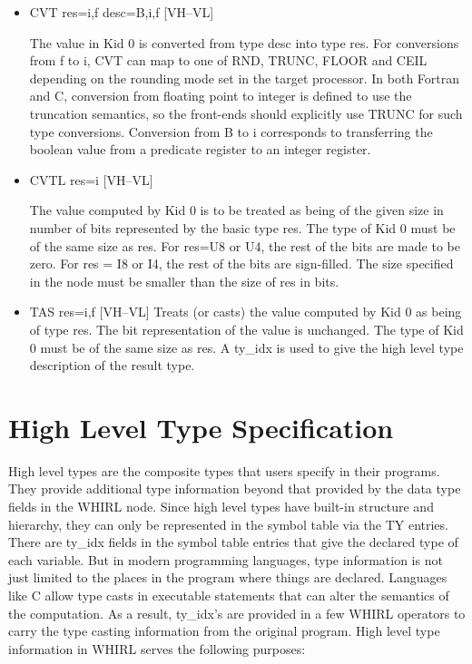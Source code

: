 \documentclass{article}
\begin{document}
\begin{itemize}
\item  CVT res=i,f desc=B,i,f \hfill [VH--VL]

The value in Kid 0 is converted from type desc into type res. For
conversions from f to i,
CVT can map to one of RND, TRUNC, FLOOR and CEIL depending on the
rounding mode set in the target processor. In both Fortran and C,
conversion from floating point to integer is defined to use
the truncation semantics, so the front-ends should explicitly use
TRUNC for such type conversions. Conversion from B to i corresponds
to transferring the boolean value from a predicate register to an
integer register. 

\item  CVTL res=i \hfill [VH--VL]

The value computed by Kid 0 is to be treated as being of the given
size in number of bits represented by the basic type res. The type
of Kid 0 must
be of the same size as res. For res=U8 or U4, the rest of the bits
are made to be zero. For res = I8 or I4, the rest of the bits are
sign-filled. The size specified in the node must be smaller than
the size of res in bits. \item  TAS res=i,f \hfill [VH--VL]
Treats (or casts) the value computed by Kid 0 as being of type res.
The bit representation of the value is unchanged. The type of Kid
0 must be of
the same size as res. A ty\_idx is used to give the high level type
description of the result type.

\end{itemize}

\section{High Level Type Specification}

High level types are the composite types that users specify in
their programs. They provide additional type information beyond
that provided by the data type fields in the WHIRL node. Since high
level types have built-in structure and hierarchy, they can only
be represented in the symbol table via the TY entries. There are
ty\_idx fields in the symbol table entries that give the declared
type of each variable. But in modern programming languages, type
information is not just limited to the places in the program where
things are declared. Languages like C allow type casts in executable
statements that can alter the semantics of the computation. As
a result, ty\_idx's are provided in a few WHIRL operators to carry
the type
casting information from the original program. High level type
information in WHIRL serves the following purposes: 
\end{document}
